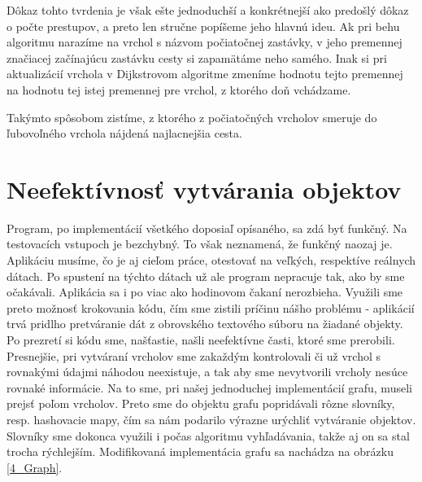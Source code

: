 Dôkaz tohto tvrdenia je však ešte jednoduchší a konkrétnejší ako predošlý dôkaz o počte prestupov, a preto len stručne popíšeme jeho hlavnú ideu. Ak pri behu algoritmu narazíme na vrchol s názvom počiatočnej zastávky, v jeho premennej značiacej začínajúcu zastávku cesty si zapamätáme neho samého. Inak si pri aktualizácií vrchola v Dijkstrovom algoritme zmeníme hodnotu tejto premennej na hodnotu tej istej premennej pre vrchol, z ktorého doň vchádzame. \newline

Takýmto spôsobom zistíme, z ktorého z počiatočných vrcholov smeruje do ľubovoľného vrchola nájdená najlacnejšia cesta.\newline


\section{Neefektívnosť vytvárania objektov}

Program, po implementácií všetkého doposiaľ opísaného, sa zdá byť funkčný. Na testovacích vstupoch je bezchybný. To však neznamená, že funkčný naozaj je. Aplikáciu musíme, čo je aj cieľom práce, otestovať na veľkých, respektíve reálnych dátach. Po spustení na týchto dátach už ale program nepracuje tak, ako by sme očakávali. Aplikácia sa i po viac ako hodinovom čakaní nerozbieha. Využili sme preto možnosť krokovania kódu, čím sme zistili príčinu nášho problému - aplikácií trvá pridlho pretváranie dát z obrovského textového súboru na žiadané objekty. Po prezretí si kódu sme, našťastie, našli neefektívne časti, ktoré sme prerobili. Presnejšie, pri vytváraní vrcholov sme zakaždým kontrolovali či už vrchol s rovnakými údajmi náhodou neexistuje, a tak aby sme nevytvorili vrcholy nesúce rovnaké informácie. Na to sme, pri našej jednoduchej implementácií grafu, museli prejsť poľom vrcholov. Preto sme do objektu grafu popridávali rôzne slovníky, resp. hashovacie mapy, čím sa nám podarilo výrazne urýchliť vytváranie objektov. Slovníky sme dokonca využili i počas algoritmu vyhľadávania, takže aj on sa stal trocha rýchlejším. Modifikovaná implementácia grafu sa nachádza na obrázku \ref{4_Graph}.\newline

